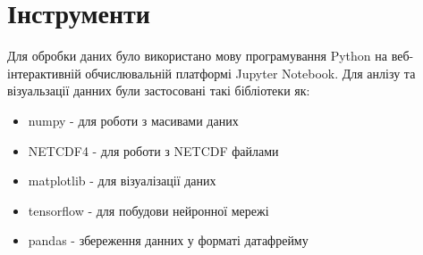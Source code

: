 \section{Інструменти}

Для обробки даних було використано мову програмування Python на веб-інтерактивній обчислювальній платформі Jupyter Notebook. 
Для анлізу та візуальзації данних були застосовані такі бібліотеки як: 

\begin{itemize}
    \item numpy - для роботи з масивами даних
    \item NETCDF4 - для роботи з NETCDF файлами
    \item matplotlib - для візуалізації даних
    \item tensorflow - для побудови нейронної мережі
    \item pandas - збереження данних у форматі датафрейму
\end{itemize}


